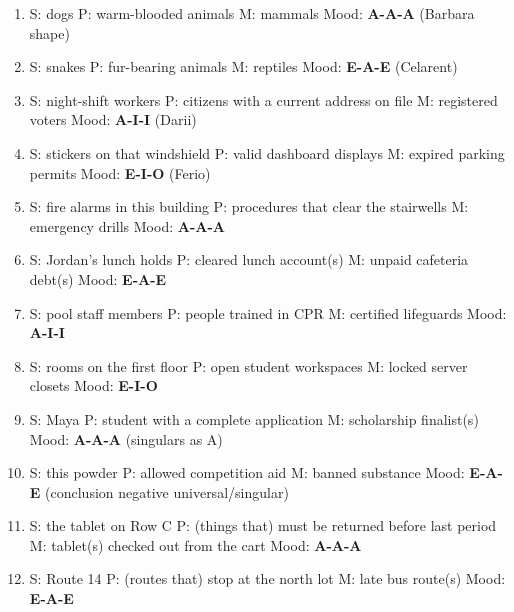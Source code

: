 \documentclass[11pt]{article}
\begin{document}
\begin{enumerate}
\item[\textbf{B1}] S: dogs \quad P: warm-blooded animals \quad M: mammals \quad Mood: \textbf{A-A-A} (Barbara shape)
\item[\textbf{B2}] S: snakes \quad P: fur-bearing animals \quad M: reptiles \quad Mood: \textbf{E-A-E} (Celarent)
\item[\textbf{B3}] S: night-shift workers \quad P: citizens with a current address on file \quad M: registered voters \quad Mood: \textbf{A-I-I} (Darii)
\item[\textbf{B4}] S: stickers on that windshield \quad P: valid dashboard displays \quad M: expired parking permits \quad Mood: \textbf{E-I-O} (Ferio)
\item[\textbf{B5}] S: fire alarms in this building \quad P: procedures that clear the stairwells \quad M: emergency drills \quad Mood: \textbf{A-A-A}
\item[\textbf{B6}] S: Jordan's lunch holds \quad P: cleared lunch account(s) \quad M: unpaid cafeteria debt(s) \quad Mood: \textbf{E-A-E}
\item[\textbf{B7}] S: pool staff members \quad P: people trained in CPR \quad M: certified lifeguards \quad Mood: \textbf{A-I-I}
\item[\textbf{B8}] S: rooms on the first floor \quad P: open student workspaces \quad M: locked server closets \quad Mood: \textbf{E-I-O}
\item[\textbf{B9}] S: Maya \quad P: student with a complete application \quad M: scholarship finalist(s) \quad Mood: \textbf{A-A-A} (singulars as A)
\item[\textbf{B10}] S: this powder \quad P: allowed competition aid \quad M: banned substance \quad Mood: \textbf{E-A-E} (conclusion negative universal/singular)
\item[\textbf{B11}] S: the tablet on Row C \quad P: (things that) must be returned before last period \quad M: tablet(s) checked out from the cart \quad Mood: \textbf{A-A-A}
\item[\textbf{B12}] S: Route 14 \quad P: (routes that) stop at the north lot \quad M: late bus route(s) \quad Mood: \textbf{E-A-E}
\end{enumerate}
\end{document}
